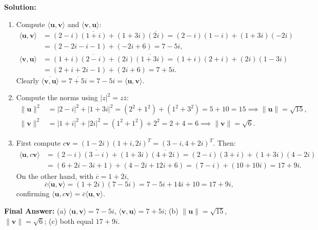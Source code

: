\documentclass[11pt, letterpaper]{article}
\theoremstyle{definition}
\theoremstyle{remark}
\begin{document}
\textbf{Solution:}
\begin{enumerate}[label=(\alph*)]
    \item Compute $\langle \mathbf{u}, \mathbf{v} \rangle$ and $\langle \mathbf{v}, \mathbf{u} \rangle$:
    \begin{align*}
    \langle \mathbf{u}, \mathbf{v} \rangle &= (2 - i)\overline{(1 + i)} + (1 + 3i)\overline{(2i)} = (2 - i)(1 - i) + (1 + 3i)(-2i) \\
    &= (2 - 2i - i - 1) + (-2i + 6) = 7 - 5i, \\
    \langle \mathbf{v}, \mathbf{u} \rangle &= (1 + i)\overline{(2 - i)} + (2i)\overline{(1 + 3i)} = (1 + i)(2 + i) + (2i)(1 - 3i) \\
    &= (2 + i + 2i - 1) + (2i + 6) = 7 + 5i.
    \end{align*}
    Clearly $\overline{\langle \mathbf{v}, \mathbf{u} \rangle} = \overline{7 + 5i} = 7 - 5i = \langle \mathbf{u}, \mathbf{v} \rangle$.
    \item Compute the norms using $|z|^2 = z\overline{z}$:
    \begin{align*}
    \|\mathbf{u}\|^2 &= |2 - i|^2 + |1 + 3i|^2 = (2^2 + 1^2) + (1^2 + 3^2) = 5 + 10 = 15 \implies \|\mathbf{u}\| = \sqrt{15}, \\
    \|\mathbf{v}\|^2 &= |1 + i|^2 + |2i|^2 = (1^2 + 1^2) + 2^2 = 2 + 4 = 6 \implies \|\mathbf{v}\| = \sqrt{6}.
    \end{align*}
    \item First compute $c\mathbf{v} = (1 - 2i)(1 + i, 2i)^T = (3 - i, 4 + 2i)^T$. Then:
    \begin{align*}
    \langle \mathbf{u}, c\mathbf{v} \rangle &= (2 - i)\overline{(3 - i)} + (1 + 3i)\overline{(4 + 2i)} = (2 - i)(3 + i) + (1 + 3i)(4 - 2i) \\
    &= (6 + 2i - 3i + 1) + (4 - 2i + 12i + 6) = (7 - i) + (10 + 10i) = 17 + 9i.
    \end{align*}
    On the other hand, with $\overline{c} = 1 + 2i$,
    \[
    \overline{c}\langle \mathbf{u}, \mathbf{v} \rangle = (1 + 2i)(7 - 5i) = 7 - 5i + 14i + 10 = 17 + 9i,
    \]
    confirming $\langle \mathbf{u}, c\mathbf{v} \rangle = \overline{c}\langle \mathbf{u}, \mathbf{v} \rangle$.
\end{enumerate}
\textbf{Final Answer:} (a) $\langle \mathbf{u}, \mathbf{v} \rangle = 7 - 5i$, $\langle \mathbf{v}, \mathbf{u} \rangle = 7 + 5i$; (b) $\|\mathbf{u}\| = \sqrt{15}$, $\|\mathbf{v}\| = \sqrt{6}$; (c) both equal $17 + 9i$.

\medskip
\end{document}
